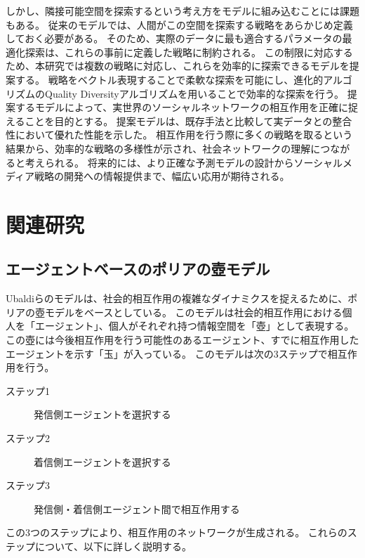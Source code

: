 \documentclass[uplatex,11pt,openany]{ujreport}
\begin{document}
    しかし、隣接可能空間を探索するという考え方をモデルに組み込むことには課題もある。
    従来のモデルでは、人間がこの空間を探索する戦略をあらかじめ定義しておく必要がある。
    そのため、実際のデータに最も適合するパラメータの最適化探索は、これらの事前に定義した戦略に制約される\cite{suda_exploration_2022,suda_agent-based_2022,ubaldi_emergence_2021}。
    この制限に対応するため、本研究では複数の戦略に対応し、これらを効率的に探索できるモデルを提案する。
    戦略をベクトル表現することで柔軟な探索を可能にし、進化的アルゴリズムのQuality Diversityアルゴリズムを用いることで効率的な探索を行う。
    提案するモデルによって、実世界のソーシャルネットワークの相互作用を正確に捉えることを目的とする。
    提案モデルは、既存手法と比較して実データとの整合性において優れた性能を示した。
    相互作用を行う際に多くの戦略を取るという結果から、効率的な戦略の多様性が示され、社会ネットワークの理解につながると考えられる。
    将来的には、より正確な予測モデルの設計からソーシャルメディア戦略の開発への情報提供まで、幅広い応用が期待される。





\chapter{関連研究}
    \section{エージェントベースのポリアの壺モデル}
    Ubaldiらのモデルは、社会的相互作用の複雑なダイナミクスを捉えるために、ポリアの壺モデルをベースとしている\cite{ubaldi_emergence_2021}。
    このモデルは社会的相互作用における個人を「エージェント」、個人がそれぞれ持つ情報空間を「壺」として表現する。
    この壺には今後相互作用を行う可能性のあるエージェント、すでに相互作用したエージェントを示す「玉」が入っている。
    このモデルは次の3ステップで相互作用を行う。
        \begin{description}
            \item[ステップ1] 発信側エージェントを選択する
            \item[ステップ2] 着信側エージェントを選択する
            \item[ステップ3] 発信側・着信側エージェント間で相互作用する
        \end{description}
    この3つのステップにより、相互作用のネットワークが生成される。
    これらのステップについて、以下に詳しく説明する。
\end{document}
